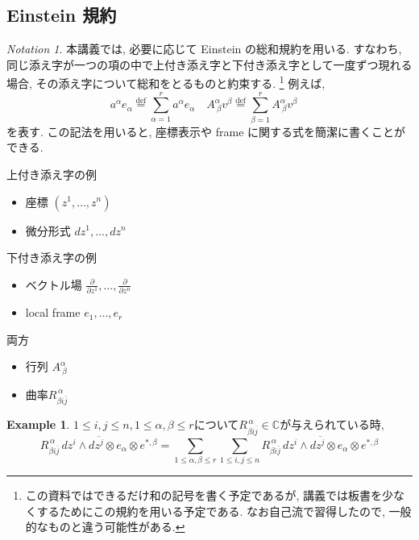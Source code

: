 \documentclass[dvipdfmx,a4paper,11pt]{article} %
\theoremstyle{definition}
\newtheorem{ex}[thm]{Example}
\theoremstyle{remark}
\newtheorem{notation}[thm]{Notation}
\numberwithin{equation}{section}
\newcommand{\C}{\mathbb{C}}
\begin{document}
\subsection{Einstein 規約}
\begin{notation}
本講義では, 必要に応じて Einstein の総和規約を用いる. すなわち, 同じ添え字が一つの項の中で上付き添え字と下付き添え字として一度ずつ現れる場合, その添え字について総和をとるものと約束する. \footnote{この資料ではできるだけ和の記号を書く予定であるが, 講義では板書を少なくするためにこの規約を用いる予定である. なお自己流で習得したので, 一般的なものと違う可能性がある.}
例えば,
\[
a^\alpha e_\alpha
\overset{\text{def}}{=}\sum_{\alpha=1}^r a^\alpha e_\alpha
\quad
A^\alpha_{\ \beta}v^\beta
\overset{\text{def}}{=}\sum_{\beta=1}^r A^\alpha_{\ \beta}v^\beta
\quad
\]
を表す. この記法を用いると, 座標表示や frame に関する式を簡潔に書くことができる.
\end{notation}

上付き添え字の例
\begin{itemize}
\item 座標 $(z^{1}, \ldots, z^{n})$
\item 微分形式 $dz^1, \ldots, dz^n$
\end{itemize}

下付き添え字の例
\begin{itemize}
\item ベクトル場 $\frac{\partial}{\partial z^1}, \ldots, \frac{\partial}{\partial z^n}$
\item local frame $e_1, \ldots, e_r$
\end{itemize}

両方
\begin{itemize}
\item 行列 $A^\alpha_{\ \beta}$
\item 曲率$R_{\beta i\overline{j}}^{\,\alpha}$
\end{itemize}

\begin{ex}
$1 \le i,j \le n, 1 \le \alpha, \beta \le r$について$R_{\beta i\overline{j}}^{\,\alpha} \in \C$が与えられている時, 
\begin{equation}
R_{\beta i\overline{j}}^{\,\alpha}\,dz^i\wedge d\overline{z^j} \otimes e_{\alpha} \otimes e^{*, \beta}
=\sum_{1\le \alpha, \beta \le r}\sum_{1 \le i,j \le n}
 R_{\beta i\overline{j}}^{\,\alpha}\,dz^i\wedge d\overline{z^j} \otimes e_{\alpha} \otimes e^{*, \beta}
\end{equation}
\end{ex}
\end{document}
